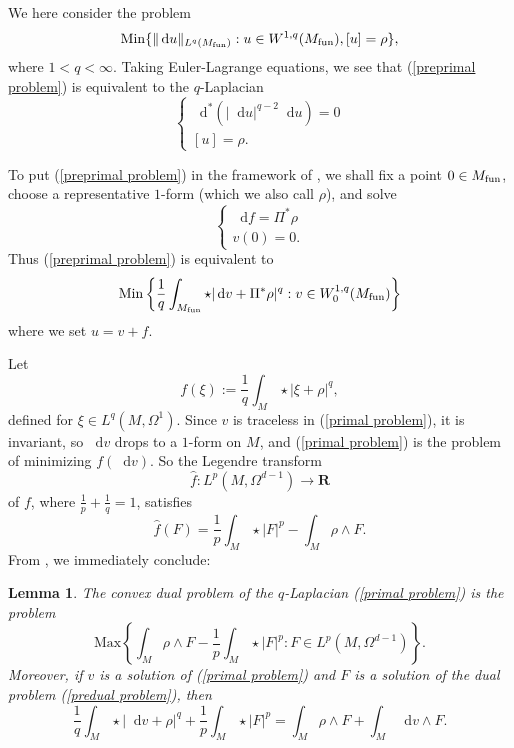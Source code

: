 \documentclass[reqno,11pt]{amsart}
\newcommand{\RR}{\mathbf{R}}
\newcommand*\dif{\mathop{}\!\mathrm{d}}
\newcommand{\Min}{\mathrm{Min}}
\newcommand{\Max}{\mathrm{Max}}
\newtheorem{lemma}[theorem]{Lemma}
\theoremstyle{definition}
\numberwithin{equation}{section}
\begin{document}
We here consider the problem
\begin{equation}\label{preprimal problem}
	\Min\{\|\dif u\|_{L^q(M_{\rm fun})}: u \in W^{1, q}(M_{\rm fun}), [u] = \rho\},
\end{equation}
where $1 < q < \infty$.
Taking Euler-Lagrange equations, we see that (\ref{preprimal problem}) is equivalent to the $q$-Laplacian 
$$\begin{cases}
	\dif^*(|\dif u|^{q - 2} \dif u) = 0 \\
	[u] = \rho.
\end{cases}$$

To put (\ref{preprimal problem}) in the framework of \cite[Chapter IV]{Ekeland99}, we shall fix a point $0 \in M_{\rm fun}$, choose a representative $1$-form (which we also call $\rho$), and solve 
$$\begin{cases}
\dif f = \Pi^* \rho \\
v(0) = 0.
\end{cases}$$
Thus (\ref{preprimal problem}) is equivalent to
\begin{equation}\label{primal problem}
	\Min\left\{\frac{1}{q} \int_{M_{\rm fun}} \star|\dif v + \Pi^* \rho|^q: v \in W^{1, q}_0(M_{\rm fun})\right\}
\end{equation}
where we set $u = v + f$.

Let
$$f(\xi) := \frac{1}{q} \int_M \star|\xi + \rho|^q,$$
defined for $\xi \in L^q(M, \Omega^1)$.
Since $v$ is traceless in (\ref{primal problem}), it is invariant, so $\dif v$ drops to a $1$-form on $M$, and (\ref{primal problem}) is the problem of minimizing $f(\dif v)$.
So the Legendre transform
$$\hat f: L^p(M, \Omega^{d - 1}) \to \RR$$
of $f$, where $\frac{1}{p} + \frac{1}{q} = 1$, satisfies
$$\hat f(F) = \frac{1}{p} \int_M \star |F|^p - \int_M \rho \wedge F.$$
From \cite[III(4.18) and III(4.23)]{Ekeland99}, we immediately conclude:

\begin{lemma}
The convex dual problem of the $q$-Laplacian (\ref{primal problem}) is the problem 
\begin{equation}\label{predual problem}
\Max\left\{\int_M \rho \wedge F - \frac{1}{p} \int_M \star |F|^p: F \in L^p(M, \Omega^{d - 1})\right\}.
\end{equation}
Moreover, if $v$ is a solution of (\ref{primal problem}) and $F$ is a solution of the dual problem (\ref{predual problem}), then
\begin{equation}\label{extremality relations}
\frac{1}{q} \int_M \star |\dif v + \rho|^q + \frac{1}{p} \int_M \star |F|^p = \int_M \rho \wedge F + \int_M \dif v \wedge F.
\end{equation}
\end{lemma}
\end{document}
